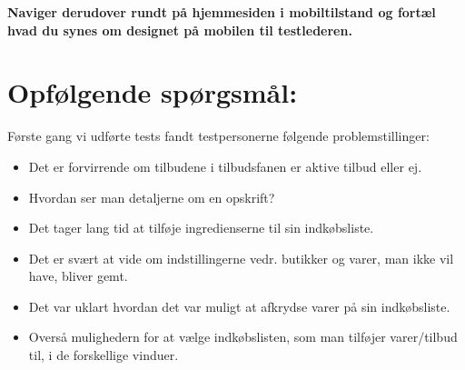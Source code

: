 \textbf{Naviger derudover rundt på hjemmesiden i mobiltilstand og fortæl hvad du synes om designet på mobilen til testlederen.}


\section{Opfølgende spørgsmål:}

Første gang vi udførte tests fandt testpersonerne følgende problemstillinger:

\begin{itemize}
	\item Det er forvirrende om tilbudene i tilbudsfanen er aktive tilbud eller ej.
	\item Hvordan ser man detaljerne om en opskrift?
	\item Det tager lang tid at tilføje ingredienserne til sin indkøbsliste.
	\item Det er svært at vide om indstillingerne vedr. butikker og varer, man ikke vil have, bliver gemt.
	\item Det var uklart hvordan det var muligt at afkrydse varer på sin indkøbsliste.
	\item Overså mulighedern for at vælge indkøbslisten, som man tilføjer varer/tilbud til, i de forskellige vinduer.
\end{itemize}


